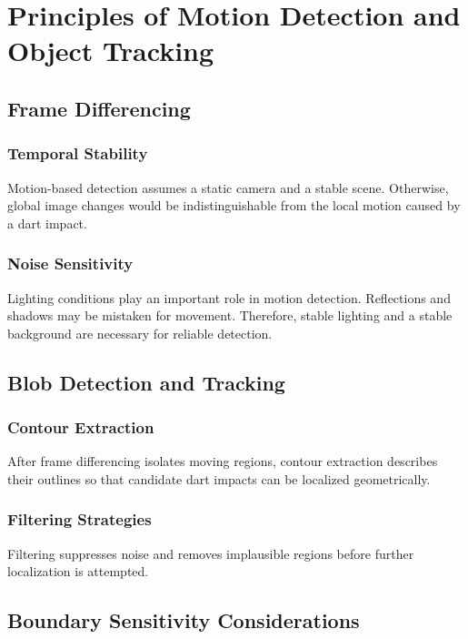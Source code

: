 \section{Principles of Motion Detection and Object Tracking}

\subsection{Frame Differencing}

\subsubsection{Temporal Stability}

Motion-based detection assumes a static camera and a stable scene. Otherwise, global image changes would be indistinguishable from the local motion caused by a dart impact.

\subsubsection{Noise Sensitivity}

Lighting conditions play an important role in motion detection. Reflections and shadows may be mistaken for movement. Therefore, stable lighting and a stable background are necessary for reliable detection.

\subsection{Blob Detection and Tracking}

\subsubsection{Contour Extraction}

After frame differencing isolates moving regions, contour extraction describes their outlines so that candidate dart impacts can be localized geometrically.

\subsubsection{Filtering Strategies}

Filtering suppresses noise and removes implausible regions before further localization is attempted.

\subsection{Boundary Sensitivity Considerations}

